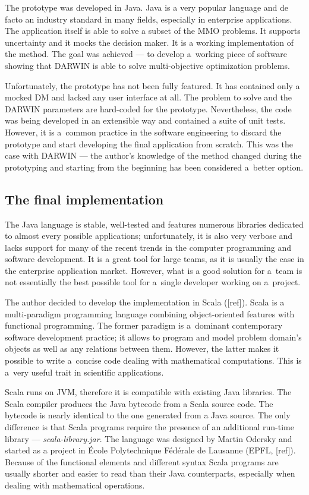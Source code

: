 The prototype was developed in Java. Java is a very popular language and de
facto an industry standard in many fields, especially in enterprise
applications. The application itself is able to solve a subset of the MMO
problems. It supports uncertainty and it mocks the decision maker. It is a
working implementation of the method. The goal was achieved --- to develop
a~working piece of software showing that DARWIN is able to solve
multi-objective optimization problems. 

Unfortunately, the prototype has not been fully featured. It has contained
only a mocked DM and lacked any user interface at all. The problem to solve
and the DARWIN parameters are hard-coded for the prototype. Nevertheless, the
code was being developed in an extensible way and contained a suite of unit
tests. However, it is a~common practice in the software engineering to discard
the prototype and start developing the final application from scratch.  This
was the case with DARWIN --- the author's knowledge of the method changed
during the prototyping and starting from the beginning has been considered
a~better option.

\subsection{The final implementation}
The Java language is stable, well-tested and features numerous libraries
dedicated to almost every possible applications; unfortunately, it is also
very verbose and lacks support for many of the recent trends in the computer
programming and software development. It is a great tool for large teams, as
it is usually the case in the enterprise application market. However, what is
a good solution for a~team is not essentially the best possible tool for
a~single developer working on a~project.

The author decided to develop the implementation in Scala ([ref]). Scala is a
multi-paradigm programming language combining object-oriented features with
functional programming. The former paradigm is a~dominant contemporary
software development practice; it allows to program and model problem domain's
objects as well as any relations between them. However, the latter makes it
possible to write a~concise code dealing with mathematical computations. This
is a~very useful trait in scientific applications.

Scala runs on JVM, therefore it is compatible with existing Java
libraries. The Scala compiler produces the Java bytecode from a Scala source
code. The bytecode is nearly identical to the one generated from a Java
source. The only difference is that Scala programs require the presence of an
additional run-time library --- \textit{scala-library.jar}. The language was
designed by Martin Odersky and started as a project in École Polytechnique
Fédérale de Lausanne (EPFL, [ref]). Because of the functional elements and
different syntax Scala programs are usually shorter and easier to read than
their Java counterparts, especially when dealing with mathematical operations.

